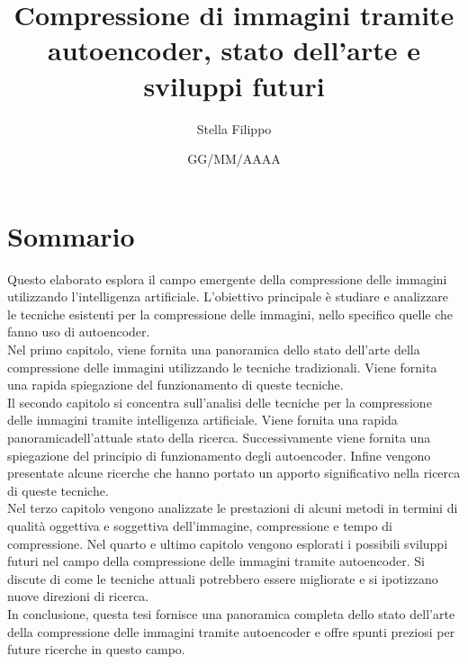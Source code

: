 \documentclass[12pt,a4paper,twoside,openright]{extreport}
\title{Compressione di immagini tramite autoencoder, stato dell’arte e sviluppi futuri}
\author{Stella Filippo}
\date{GG/MM/AAAA}
\begin{document}
    \pagestyle{empty} %

    
    \cleardoublepage
    
    
    \cleardoublepage

    \pagestyle{plain} %

    \chapter*{Sommario}
    Questo elaborato esplora il campo emergente della compressione delle immagini utilizzando l'intelligenza artificiale. L’obiettivo principale è studiare e analizzare le tecniche esistenti per la compressione delle immagini, nello specifico quelle che fanno uso di autoencoder.\\
    Nel primo capitolo, viene fornita una panoramica dello stato dell’arte della compressione delle immagini utilizzando le tecniche tradizionali. Viene fornita una rapida spiegazione del funzionamento di queste tecniche.\\
    Il secondo capitolo si concentra sull’analisi delle tecniche per la compressione delle immagini tramite intelligenza artificiale. Viene fornita una rapida panoramicadell'attuale stato della ricerca. Successivamente viene fornita una spiegazione del principio di funzionamento degli autoencoder. Infine vengono presentate alcune ricerche che hanno portato un apporto significativo nella ricerca di queste tecniche.\\
    Nel terzo capitolo vengono analizzate le prestazioni di alcuni metodi in termini di qualità oggettiva e soggettiva dell'immagine, compressione e tempo di compressione. 
    Nel quarto e ultimo capitolo vengono esplorati i possibili sviluppi futuri nel campo della compressione delle immagini tramite autoencoder. Si discute di come le tecniche attuali potrebbero essere migliorate e si ipotizzano nuove direzioni di ricerca.\\
    In conclusione, questa tesi fornisce una panoramica completa dello stato dell’arte della compressione delle immagini tramite autoencoder e offre spunti preziosi per future ricerche in questo campo.\\

    \cleardoublepage

    \tableofcontents
    \cleardoublepage
    
    \listoffigures
    \cleardoublepage 

    \setcounter{figure}{0} 
    
    
    
    
    
    
    
    \cleardoublepage

    \printbibliography[heading=bibintoc]
\end{document}
